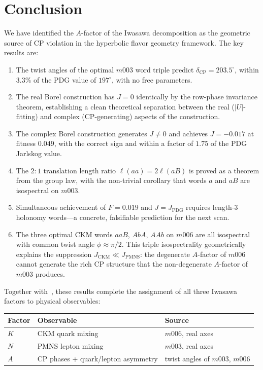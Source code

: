 ﻿\documentclass[epjc3]{svjour3}
\begin{document}
\section{Conclusion}
\label{sec:conclusion}

We have identified the $A$-factor of the Iwasawa decomposition as the
geometric source of CP violation in the hyperbolic flavor geometry
framework.  The key results are:
\begin{enumerate}
  \item The twist angles of the optimal $m003$ word triple predict
    $\delta_{\mathrm{CP}} = 203.5^\circ$, within 3.3\% of the PDG
    value of $197^\circ$, with no free parameters.
  \item The real Borel construction has $J = 0$ identically by the
    row-phase invariance theorem, establishing a clean theoretical
    separation between the real ($|U|$-fitting) and complex
    (CP-generating) aspects of the construction.
  \item The complex Borel construction generates $J \neq 0$ and
    achieves $J = -0.017$ at fitness $0.049$, with the correct sign
    and within a factor of $1.75$ of the PDG Jarlskog value.
  \item The $2\!:\!1$ translation length ratio $\ell(aa) = 2\ell(aB)$
    is proved as a theorem from the group law, with the non-trivial
    corollary that words $a$ and $aB$ are isospectral on $m003$.
  \item Simultaneous achievement of $F = 0.019$ and
    $J = J_{\mathrm{PDG}}$ requires length-3 holonomy words---a
    concrete, falsifiable prediction for the next scan.
  \item The three optimal CKM words $aaB$, $AbA$, $AAb$ on $m006$
    are all isospectral with common twist angle $\phi \approx \pi/2$.
    This triple isospectrality geometrically explains the suppression
    $J_{\mathrm{CKM}} \ll J_{\mathrm{PMNS}}$: the degenerate
    $A$-factor of $m006$ cannot generate the rich CP structure that
    the non-degenerate $A$-factor of $m003$ produces.
\end{enumerate}

Together with~\cite{Gentry2026c,Gentry2026b}, these results complete
the assignment of all three Iwasawa factors to physical observables:

\begin{center}
\begin{tabular}{lll}
\toprule
Factor & Observable & Source \\
\midrule
$K$ & CKM quark mixing           & $m006$, real axes \\
$N$ & PMNS lepton mixing          & $m003$, real axes \\
$A$ & CP phases + quark/lepton asymmetry & twist angles of $m003$, $m006$ \\
\bottomrule
\end{tabular}
\end{center}
\end{document}
